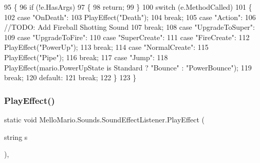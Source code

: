 \begin{DoxyCode}
95         \{
96             \textcolor{keywordflow}{if} (!e.HasArgs)
97             \{
98                 \textcolor{keywordflow}{return};
99             \}
100             \textcolor{keywordflow}{switch} (e.MethodCalled)
101             \{
102                 \textcolor{keywordflow}{case} \textcolor{stringliteral}{"OnDeath"}:
103                     PlayEffect(\textcolor{stringliteral}{"Death"});
104                     \textcolor{keywordflow}{break};
105                 \textcolor{keywordflow}{case} \textcolor{stringliteral}{"Action"}:
106                     \textcolor{comment}{//TODO: Add Fireball Shotting Sound}
107                     \textcolor{keywordflow}{break};
108                 \textcolor{keywordflow}{case} \textcolor{stringliteral}{"UpgradeToSuper"}:
109                 \textcolor{keywordflow}{case} \textcolor{stringliteral}{"UpgradeToFire"}:
110                 \textcolor{keywordflow}{case} \textcolor{stringliteral}{"SuperCreate"}:
111                 \textcolor{keywordflow}{case} \textcolor{stringliteral}{"FireCreate"}:
112                     PlayEffect(\textcolor{stringliteral}{"PowerUp"});
113                     \textcolor{keywordflow}{break};
114                 \textcolor{keywordflow}{case} \textcolor{stringliteral}{"NormalCreate"}:
115                     PlayEffect(\textcolor{stringliteral}{"Pipe"});
116                     \textcolor{keywordflow}{break};
117                 \textcolor{keywordflow}{case} \textcolor{stringliteral}{"Jump"}:
118                     PlayEffect(mario.PowerUpState is Standard ? \textcolor{stringliteral}{"Bounce"} : \textcolor{stringliteral}{"PowerBounce"});
119                     \textcolor{keywordflow}{break};
120                 \textcolor{keywordflow}{default}:
121                     \textcolor{keywordflow}{break};
122             \}
123         \}
\end{DoxyCode}
\mbox{\label{classMelloMario_1_1Sounds_1_1SoundEffectListener_aadfaddabd043922db12d673e17547894}} 
\subsubsection{Play\+Effect()}
{\footnotesize\ttfamily static void Mello\+Mario.\+Sounds.\+Sound\+Effect\+Listener.\+Play\+Effect (\begin{DoxyParamCaption}\item[{string}]{s }\end{DoxyParamCaption})\hspace{0.3cm}{\ttfamily [static]}, {\ttfamily [private]}}



